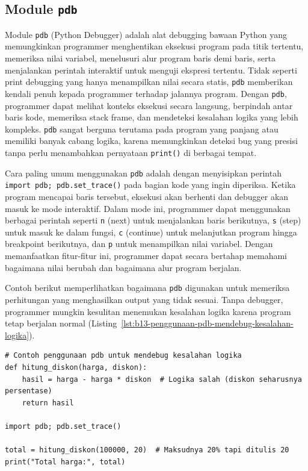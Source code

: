 \subsection{Module \texttt{pdb}}

Module \texttt{pdb} (Python Debugger) adalah alat debugging bawaan Python yang memungkinkan programmer menghentikan eksekusi program pada titik tertentu, memeriksa nilai variabel, menelusuri alur program baris demi baris, serta menjalankan perintah interaktif untuk menguji ekspresi tertentu. Tidak seperti print debugging yang hanya menampilkan nilai secara statis, \texttt{pdb} memberikan kendali penuh kepada programmer terhadap jalannya program. Dengan \texttt{pdb}, programmer dapat melihat konteks eksekusi secara langsung, berpindah antar baris kode, memeriksa stack frame, dan mendeteksi kesalahan logika yang lebih kompleks. \texttt{pdb} sangat berguna terutama pada program yang panjang atau memiliki banyak cabang logika, karena memungkinkan deteksi bug yang presisi tanpa perlu menambahkan pernyataan \texttt{print()} di berbagai tempat.

Cara paling umum menggunakan \texttt{pdb} adalah dengan menyisipkan perintah \texttt{import pdb; pdb.set\_trace()} pada bagian kode yang ingin diperiksa. Ketika program mencapai baris tersebut, eksekusi akan berhenti dan debugger akan masuk ke mode interaktif. Dalam mode ini, programmer dapat menggunakan berbagai perintah seperti \texttt{n} (next) untuk menjalankan baris berikutnya, \texttt{s} (step) untuk masuk ke dalam fungsi, \texttt{c} (continue) untuk melanjutkan program hingga breakpoint berikutnya, dan \texttt{p} untuk menampilkan nilai variabel. Dengan memanfaatkan fitur-fitur ini, programmer dapat secara bertahap memahami bagaimana nilai berubah dan bagaimana alur program berjalan.

Contoh berikut memperlihatkan bagaimana \texttt{pdb} digunakan untuk memeriksa perhitungan yang menghasilkan output yang tidak sesuai. Tanpa debugger, programmer mungkin kesulitan menemukan kesalahan logika karena program tetap berjalan normal (Listing~\ref{lst:b13-penggunaan-pdb-mendebug-kesalahan-logika}).

\begin{lstlisting}[style=PythonStyle, caption={Contoh penggunaan pdb untuk mendebug kesalahan logika}, label={lst:b13-penggunaan-pdb-mendebug-kesalahan-logika}]
# Contoh penggunaan pdb untuk mendebug kesalahan logika
def hitung_diskon(harga, diskon):
    hasil = harga - harga * diskon  # Logika salah (diskon seharusnya persentase)
    return hasil

import pdb; pdb.set_trace()

total = hitung_diskon(100000, 20)  # Maksudnya 20% tapi ditulis 20
print("Total harga:", total)
\end{lstlisting}

